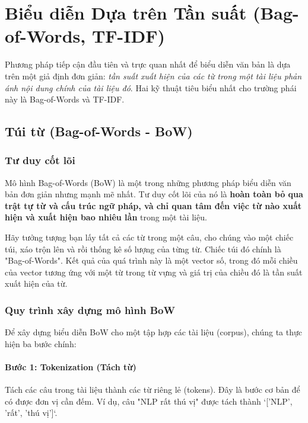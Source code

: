 

\section{Biểu diễn Dựa trên Tần suất (Bag-of-Words, TF-IDF)}
\label{sec:frequency_representation}

Phương pháp tiếp cận đầu tiên và trực quan nhất để biểu diễn văn bản là dựa trên một giả định đơn giản: \textit{tần suất xuất hiện của các từ trong một tài liệu phản ánh nội dung chính của tài liệu đó}. Hai kỹ thuật tiêu biểu nhất cho trường phái này là Bag-of-Words và TF-IDF.

\subsection{Túi từ (Bag-of-Words - BoW)}
\label{ssec:bow}

\subsubsection{Tư duy cốt lõi}

Mô hình Bag-of-Words (BoW) là một trong những phương pháp biểu diễn văn bản đơn giản nhưng mạnh mẽ nhất. Tư duy cốt lõi của nó là \textbf{hoàn toàn bỏ qua trật tự từ và cấu trúc ngữ pháp, và chỉ quan tâm đến việc từ nào xuất hiện và xuất hiện bao nhiêu lần} trong một tài liệu.

Hãy tưởng tượng bạn lấy tất cả các từ trong một câu, cho chúng vào một chiếc túi, xáo trộn lên và rồi thống kê số lượng của từng từ. Chiếc túi đó chính là "Bag-of-Words". Kết quả của quá trình này là một vector số, trong đó mỗi chiều của vector tương ứng với một từ trong từ vựng và giá trị của chiều đó là tần suất xuất hiện của từ.

\subsubsection{Quy trình xây dựng mô hình BoW}
Để xây dựng biểu diễn BoW cho một tập hợp các tài liệu (corpus), chúng ta thực hiện ba bước chính:

\paragraph{Bước 1: Tokenization (Tách từ)}
Tách các câu trong tài liệu thành các từ riêng lẻ (tokens). Đây là bước cơ bản để có được đơn vị cần đếm. Ví dụ, câu "NLP rất thú vị" được tách thành `['NLP', 'rất', 'thú vị']`.

